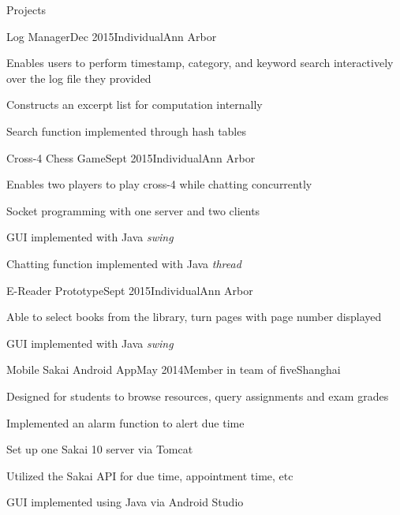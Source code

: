 \documentclass{resume} %
\begin{document}
\begin{rSection}{Projects}

	\begin{rSubsection}{Log Manager}{Dec 2015}{Individual}{Ann Arbor}
		\item Enables users to perform timestamp, category, and keyword search interactively  over the log file they provided
		\item Constructs an excerpt list for computation internally 
		\item Search function implemented through hash tables
	\end{rSubsection}	
	\begin{rSubsection}{Cross-4 Chess Game}{Sept 2015}{Individual}{Ann Arbor}
		\item Enables two players to play cross-4 while chatting concurrently
		\item Socket programming with one server and two clients
		\item GUI implemented with Java \textit{swing}
		\item Chatting function implemented with Java \textit{thread}		
	\end{rSubsection}
	
	\begin{rSubsection}{E-Reader Prototype}{Sept 2015}{Individual}{Ann Arbor}
		\item Able to select books from the library, turn pages with page number displayed
		\item GUI implemented with Java \textit{swing}
	\end{rSubsection}
	
	\begin{rSubsection}{Mobile Sakai Android App}{May 2014}{Member in team of five}{Shanghai}
	\item Designed for students to browse resources, query assignments and exam grades
	\item Implemented an alarm function to alert due time
	\item Set up one Sakai 10 server via Tomcat
	\item Utilized the Sakai API for due time, appointment time, etc
	\item GUI implemented using Java via Android Studio
	\end{rSubsection}

\end{rSection}
%
\end{document}
